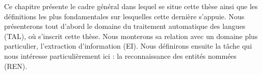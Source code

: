 \documentclass[PhD-Yoann-Dupont.tex]{subfiles}
\begin{document}

Ce chapitre présente le cadre général dans lequel se situe cette thèse ainsi que les définitions les plus fondamentales sur lesquelles cette dernière s'appuie. Nous présenterons tout d'abord le domaine du traitement automatique des langues (TAL), où s'inscrit cette thèse. Nous monterons sa relation avec un domaine plus particulier, l'extraction d'information (EI). Nous définirons ensuite la tâche qui nous intéresse particulièrement ici : la reconnaissance des entités nommées (REN).
\end{document}
